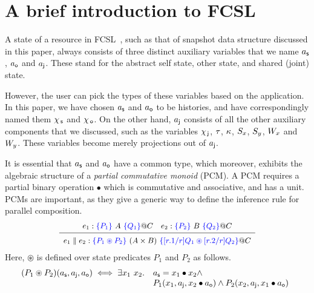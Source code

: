 \section{A brief introduction to FCSL}
\label{sc:background}

A state of a resource in FCSL~\cite{NanevskiLSD+ESOP14}, such as that
of snapshot data structure discussed in this paper, always consists of
three distinct auxiliary variables that we name $a_{\mathsf{s}}$, $a_{\mathsf{o}}$ and
$a_{\mathsf{j}}$. These stand for the abstract self state, other state, and
shared (joint) state.

However, the user can pick the types of these variables based on the
application. In this paper, we have chosen $a_{\mathsf{s}}$ and $a_{\mathsf{o}}$ to be
histories, and have correspondingly named them $\chi_{\, \mathsf{s}}$ and $\chi_{\, \mathsf{o}}$.
On the other hand, $a_{\mathsf{j}}$ consists of all the other auxiliary
components that we discussed, such as the variables $\chi_{\, \mathsf{j}}$, $\tau$,
$\kappa$, $S_x$, $S_y$, $W_x$ and $W_y$. These variables become merely
projections out of $a_{\mathsf{j}}$.

It is essential that $a_{\mathsf{s}}$ and $a_{\mathsf{o}}$ have a common type, which
moreover, exhibits the algebraic structure of a \emph{partial
  commutative monoid} (PCM). A PCM requires a partial binary operation
$\bullet$ which is commutative and associative, and has a unit. 
%
%
PCMs are important, as they give a generic way to define the inference
rule for parallel composition.
%
\[
{\small{
\begin{array}{c}
  e_1 : \specK{\{P_1\}}\ A\ \specK{\{Q_1\}} @ C \quad
  e_2 : \specK{\{P_2\}}\ B\ \specK{\{Q_2\}} @ C \\[2pt]
\hline\\[-7pt]
e_1 \parallel e_2 : \specK{\{P_1 \circledast P_2\}}\ (A \times B)\
\specK{\{[r.1/r]Q_1 \circledast [r.2/r]Q_2\}} @ C
\end{array}
}}
\]
Here, $\circledast$ is defined over state predicates $P_1$ and $P_2$
as follows.
\[
\begin{array}{c}
  (P_1 \circledast P_2) (a_{\mathsf{s}}, a_{\mathsf{j}}, a_{\mathsf{o}}) \iff
  \exists x_1~x_2\mathord{.}\,\
  \begin{array}[t]{l}
  a_{\mathsf{s}} = x_1 \bullet x_2 \wedge \\  
  P_1 (x_1, a_{\mathsf{j}}, x_2 \bullet a_{\mathsf{o}}) \wedge
  P_2 (x_2, a_{\mathsf{j}}, x_1 \bullet a_{\mathsf{o}})
  \end{array}
\end{array}
\]

